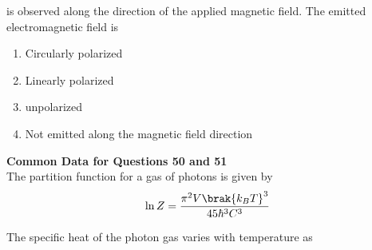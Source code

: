             is observed along the direction of the applied magnetic field. The emitted electromagnetic
            field is
            \hfill{}
            \begin{enumerate}
                \item Circularly polarized
                \item Linearly polarized
                \item unpolarized
                \item Not emitted along the magnetic field direction
            \end{enumerate}
            \textbf{Common Data for Questions 50 and 51}\\
            The partition function for a gas of photons is given by
            \begin{align}
                \ln Z = \frac{\pi^2 V\brak{k_B T}^3}{45\hbar ^3 C^3}
            \end{align}
        \item[50.] The specific heat of the photon gas varies with temperature as 
            \hfill{}
